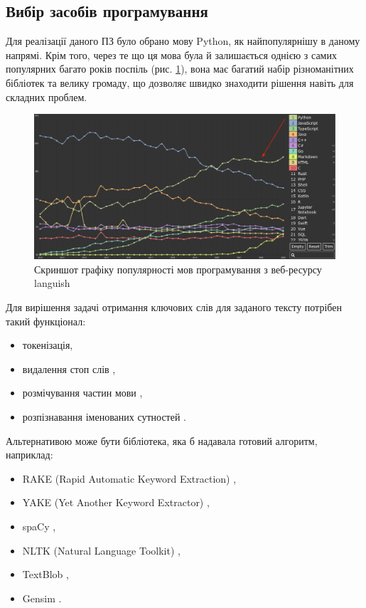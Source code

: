 \documentclass[14pt]{extarticle}
\begin{document}
  \newpage

  \subsection{Вибір засобів програмування}
  Для реалізації даного ПЗ було обрано мову Python,
  як найпопулярнішу в даному напрямі.
  Крім того,
  через те що ця мова була й залишається однією
  з самих популярних багато років поспіль
  \cite{tiobe_index, pypl, github_octoverse2022, languish}
  (рис. \ref{fig:python_languish}),
  вона має багатий набір різноманітних бібліотек та велику громаду,
  що дозволяє швидко знаходити рішення навіть для складних проблем.

  \begin{figure}[H]
    \centering
    \includegraphics[width=\textwidth]{languish_python.png}    
    \caption{Скриншот графіку популярності мов програмування
    з веб-ресурсу languish}
    \label{fig:python_languish}
  \end{figure}

  Для вирішення задачі отримання ключових слів для заданого тексту
  потрібен такий функціонал:
  \begin{itemize}[labelindent=\dimexpr{}\relax, leftmargin=*]
    \item токенізація,
    \item видалення стоп слів \cite{wiki_stop_word},
    \item розмічування частин мови \cite{wiki_pos_tagging},
    \item розпізнавання іменованих сутностей \cite{wiki_ner}.
  \end{itemize}

  Альтернативою може бути бібліотека, яка б надавала готовий алгоритм,
  наприклад:
  \begin{itemize}[labelindent=\dimexpr{}\relax, leftmargin=*]
    \item RAKE (Rapid Automatic Keyword Extraction) \cite{rake_nltk},
    \item YAKE (Yet Another Keyword Extractor) \cite{pypi_yake},
    \item spaCy \cite{spaCy},
    \item NLTK (Natural Language Toolkit) \cite{nltk},
    \item TextBlob \cite{TextBlob},
    \item Gensim \cite{gensim}.
  \end{itemize}
\end{document}
